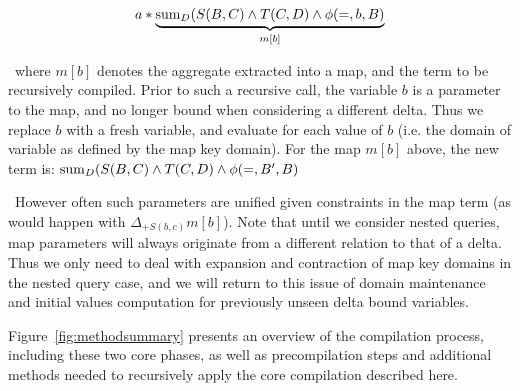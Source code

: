 \[a*\underbrace{\mathrm{sum}_{D}(S(B,C) \wedge T(C,D) \wedge \phi(=,b,B)}_{m[b]}\]

\noindent~where $m[b]$ denotes the aggregate extracted into a map, and the term
to be recursively compiled. Prior to such a recursive call, the variable $b$ is
a parameter to the map, and no longer bound when considering a different
delta. Thus we replace $b$ with a fresh variable, and evaluate for each value of
$b$ (i.e. the domain of variable as defined by the map key domain). For the map
$m[b]$ above, the new term is:
$\mathrm{sum}_{D}(S(B,C) \wedge T(C,D) \wedge \phi(=,B',B)$

\noindent~However often such parameters are unified given constraints in the map
term (as would happen with $\Delta_{+S(b,c)} m[b]$). Note that until we consider
nested queries, map parameters will always originate from a different
relation to that of a delta. Thus we only need to deal with expansion and
contraction of map key domains in the nested query case, and we will return to
this issue of domain maintenance and initial values computation for previously
unseen delta bound variables.

Figure~\ref{fig:methodsummary} presents an
overview of the compilation process, including these two core phases, as well as
precompilation steps and additional methods needed to recursively apply the core
compilation described here.


